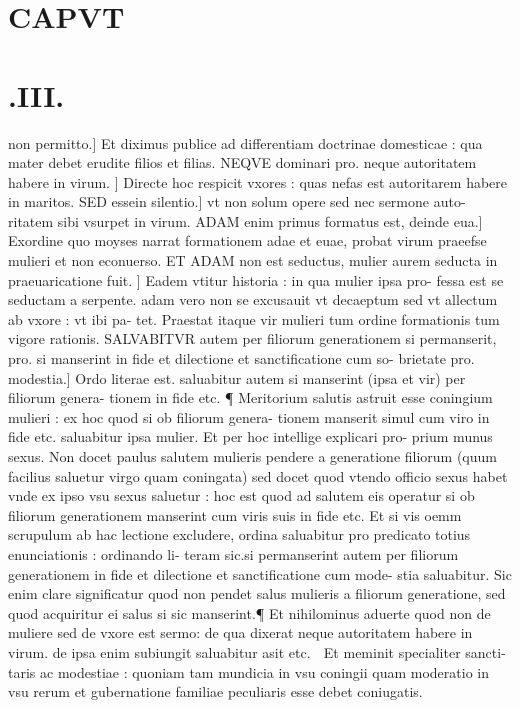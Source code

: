 \documentclass{article}
\begin{document}
\begin{pages}
\section*{CAPVT }
\section*{.III. }\pstart non permitto.] Et diximus publice ad differentiam doctrinae domesticae : qua mater debet erudite filios et filias. NEQVE dominari pro. neque autoritatem habere in virum. ] Directe hoc respicit vxores : quas nefas est autoritarem habere in maritos. SED essein silentio.] vt non solum opere sed nec sermone auto- ritatem sibi vsurpet in virum. ADAM enim primus formatus est, deinde eua.] Exordine quo moyses narrat formationem adae et euae, probat virum praeefse mulieri et non econuerso. ET ADAM non est seductus, mulier aurem seducta in praeuaricatione fuit. ] Eadem vtitur historia : in qua mulier ipsa pro- fessa est se seductam a serpente. adam vero non se excusauit vt decaeptum sed vt allectum ab vxore : vt ibi pa- tet. Praestat itaque vir mulieri tum ordine formationis tum vigore rationis. SALVABITVR autem per filiorum generationem si permanserit, pro. si manserint in fide et dilectione et sanctificatione cum so- brietate pro. modestia.] Ordo literae est. saluabitur autem si manserint (ipsa et vir) per filiorum genera- tionem in fide etc. ¶ Meritorium salutis astruit esse coningium mulieri : ex hoc quod si ob filiorum genera- tionem manserit simul cum viro in fide etc. saluabitur ipsa mulier. Et per hoc intellige explicari pro- prium munus sexus. Non docet paulus salutem mulieris pendere a generatione filiorum (quum facilius saluetur virgo quam coningata) sed docet quod vtendo officio sexus habet vnde ex ipso vsu sexus saluetur : hoc est quod ad salutem eis operatur si ob filiorum generationem manserint cum viris suis in fide etc. Et si vis oemm scrupulum ab hac lectione excludere, ordina saluabitur pro predicato totius enunciationis : ordinando li- teram sic.si permanserint autem per filiorum generationem in fide et dilectione et sanctificatione cum mode- stia saluabitur. Sic enim clare significatur quod non pendet salus mulieris a filiorum generatione, sed quod acquiritur ei salus si sic manserint.¶ Et nihilominus aduerte quod non de muliere sed de vxore est sermo: de qua dixerat neque autoritatem habere in virum. de ipsa enim subiungit saluabitur asit etc.  Et meminit specialiter sancti- taris ac modestiae : quoniam tam mundicia in vsu coningii quam moderatio in vsu rerum et gubernatione familiae peculiaris esse debet coniugatis.  \pend

\end{pages}
\end{document}

